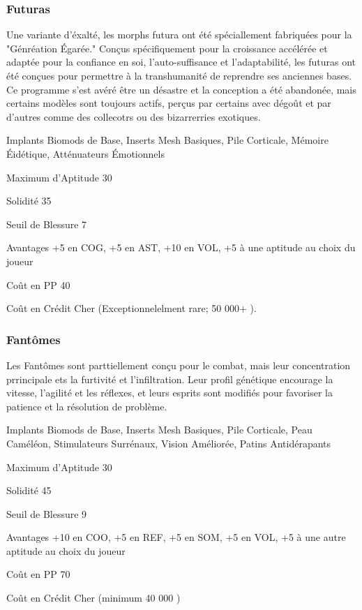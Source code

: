 \subsubsection{Futuras} \label{sec:starting-futuras} 

Une variante d'éxalté, les morphs futura ont été spéciallement fabriquées pour la "Génréation Égarée." Conçus spécifiquement pour la croissance accélérée et adaptée pour la confiance en soi, l'auto-suffisance et l'adaptabilité, les futuras ont été conçues pour permettre à la transhumanité de reprendre ses anciennes bases. Ce programme s'est avéré être un désastre et la conception a été abandonée, mais certains modèles sont toujours actifs, perçus par certains avec dégoût et par d'autres comme des collecotrs ou des bizarrerries exotiques. 

\begin{description*} \item[Implants] Biomods de Base, Inserts Mesh Basiques, Pile Corticale, Mémoire Éidétique, Atténuateurs Émotionnels\item[Maximum d'Aptitude] 30 \item[Solidité] 35 \item[Seuil de Blessure] 7 \item[Avantages] +5 en COG, +5 en AST, +10 en VOL, +5 à une aptitude au choix du joueur\item[Coût en PP] 40 \item[Coût en Crédit] Cher (Exceptionnelelment rare; 50 000+ ). \end{description*} 

\subsubsection{Fantômes} \label{sec:starting-ghosts} 

Les Fantômes sont parttiellement conçu pour le combat, mais leur concentration prrincipale ets la furtivité et l'infiltration. Leur profil génétique encourage la vitesse, l'agilité et les réflexes, et leurs esprits sont modifiés pour favoriser la patience et la résolution de problème. 

\begin{description*} \item[Implants] Biomods de Base, Inserts Mesh Basiques, Pile Corticale, Peau Caméléon, Stimulateurs Surrénaux, Vision Améliorée, Patins Antidérapants\item[Maximum d'Aptitude] 30 \item [Solidité] 45 \item[Seuil de Blessure] 9 \item[Avantages] +10 en COO, +5 en REF, +5 en SOM, +5 en VOL, +5 à une autre aptitude au choix du joueur\item[Coût en PP] 70 \item[Coût en Crédit] Cher (minimum 40 000 ) \end{description*} 

